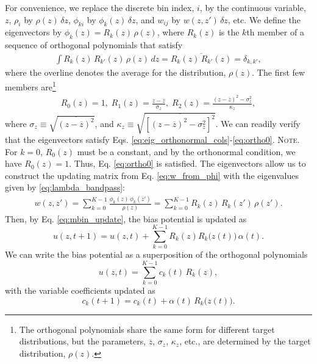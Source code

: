 \documentclass[reprint, superscriptaddress, floatfix]{revtex4-1}
\newcommand{\note}[1]{{\color{DarkGreen}\footnotesize \textsc{Note.} #1}}
\begin{document}
For convenience, we
replace the discrete bin index, $i$,
by the continuous variable, $z$,
%
$\rho_i$ by $\rho(z) \, \delta z$,
$\phi_{ki}$ by $\phi_k(z) \, \delta z$,
and
$w_{ij}$ by $w(z, z') \, \delta z$, etc.
%
We define the eigenvectors by
$\phi_k(z) = R_k(z) \, \rho(z)$,
where $R_k(z)$ is the $k$th member of a sequence of orthogonal polynomials
that satisfy
\begin{align*}
  \int R_k(z) \, R_{k'}(z) \, \rho(z) \, d z
  = \overline{ R_k(z) \, R_{k'}(z) }
  = \delta_{k, k'}
  ,
\end{align*}
%
where the overline denotes the average for the distribution, $\rho(z)$.
%
The first few members are\footnote{The
  orthogonal polynomials share the same form
  for different target distributions,
  but the parameters,
  $\overline z$,
  $\sigma_z$,
  $\kappa_z$, etc.,
  are determined by the target distribution, $\rho(z)$.}
\begin{align*}
  R_0(z) = 1, \;
  R_1(z) = \frac{z - \overline{z}}{\sigma_z}, \;
  R_2(z) = \frac{ (z - \overline{z})^2 - \sigma_z^2 } {\kappa_z},
\end{align*}
%
where $\sigma_z \equiv \sqrt{\overline{\left(z - \overline z\right)^2}}$,
and
$\kappa_z \equiv \sqrt{\overline{\left[  (z - \overline z)^2 - \sigma_z^2  \right]^2 }}$.
%
We can readily verify that the eigenvectors satisfy
Eqs. \eqref{eq:eig_orthonormal_cols}-\eqref{eq:ortho0}.
%
\note{For $k = 0$, $R_0(z)$ must be a constant,
  and by the orthonormal condition, we have $R_0(z) = 1$.
  Thus, Eq. \eqref{eq:ortho0} is satisfied.}%
%
The eigenvectors allow us to construct the updating matrix
from Eq. \eqref{eq:w_from_phi}
with the eigenvalues given by \eqref{eq:lambda_bandpass}:
\begin{align*}
  w(z, z')
  =
  \sum_{k=0}^{K-1} \frac{ \phi_k(z) \, \phi_k(z') } { \rho(z) }
  =
  \sum_{k=0}^{K-1} R_k(z) \, R_k(z') \, \rho(z')
  .
\end{align*}
%
%
Then, by Eq. \eqref{eq:mbin_update},
the bias potential is updated as
%
$$
u(z, t+1) = u(z, t)
+ \sum_{k=0}^{K-1} R_k(z) R_k\bigl( z(t) \bigr) \, \alpha(t).
$$
%
We can write the bias potential
as a superposition of the orthogonal polynomials
%
\begin{equation}
  u(z, t) = \sum_{k=0}^{K-1} c_k(t) \, R_k(z),
  \label{eq:uz_decomp}
\end{equation}
%
with the variable coefficients updated as
%
\begin{equation}
  c_k(t+1) = c_k(t) + \alpha(t) \, R_k\bigl( z(t) \bigr)
  .
  \label{eq:ckupdate}
\end{equation}
\end{document}
